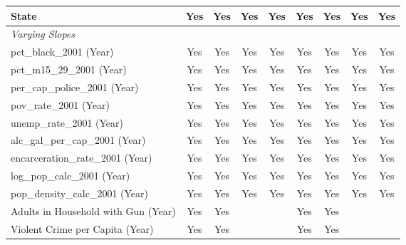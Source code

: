 \begin{tabular}{lcccccccc}
   State                               & Yes              & Yes              & Yes              & Yes              & Yes              & Yes              & Yes              & Yes\\  
   \midrule
   \emph{Varying Slopes}\\
   pct\_black\_2001 (Year)             & Yes              & Yes              & Yes              & Yes              & Yes              & Yes              & Yes              & Yes\\  
   pct\_m15\_29\_2001 (Year)           & Yes              & Yes              & Yes              & Yes              & Yes              & Yes              & Yes              & Yes\\  
   per\_cap\_police\_2001 (Year)       & Yes              & Yes              & Yes              & Yes              & Yes              & Yes              & Yes              & Yes\\  
   pov\_rate\_2001 (Year)              & Yes              & Yes              & Yes              & Yes              & Yes              & Yes              & Yes              & Yes\\  
   unemp\_rate\_2001 (Year)            & Yes              & Yes              & Yes              & Yes              & Yes              & Yes              & Yes              & Yes\\  
   alc\_gal\_per\_cap\_2001 (Year)     & Yes              & Yes              & Yes              & Yes              & Yes              & Yes              & Yes              & Yes\\  
   encarceration\_rate\_2001 (Year)    & Yes              & Yes              & Yes              & Yes              & Yes              & Yes              & Yes              & Yes\\  
   log\_pop\_calc\_2001 (Year)         & Yes              & Yes              & Yes              & Yes              & Yes              & Yes              & Yes              & Yes\\  
   pop\_density\_calc\_2001 (Year)     & Yes              & Yes              & Yes              & Yes              & Yes              & Yes              & Yes              & Yes\\  
   Adults in Household with Gun (Year) & Yes              & Yes              &                  &                  & Yes              & Yes              &                  & \\  
   Violent Crime per Capita (Year)     & Yes              & Yes              &                  &                  & Yes              & Yes              &                  & \\  

\end{tabular}
